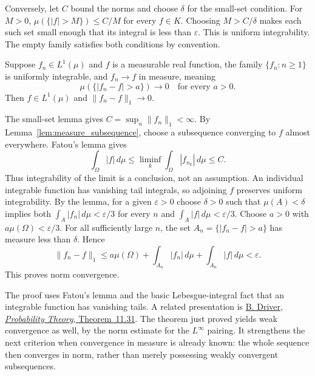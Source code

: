 Conversely, let $C$ bound the norms and choose $\delta$ for the
small-set condition. For $M>0$,
$\mu(\{|f|>M\})\leqslant C/M$ for every $f\in K$.
Choosing $M>C/\delta$ makes each such set small enough that its
integral is less than $\varepsilon$. This is uniform integrability.
The empty family satisfies both conditions by convention.
\Done

\begin{theorem}
\label{thm:vitali_finite}
Suppose $f_n\in L^1(\mu)$ and $f$ is a measurable real function, the family $\{f_n:n\geqslant1\}$ is
uniformly integrable, and $f_n\to f$ in measure, meaning
\[
\mu(\{|f_n-f|>a\})\longrightarrow0\quad\text{for every }a>0.
\]
Then $f\in L^1(\mu)$ and $\|f_n-f\|_1\to0$.
\end{theorem}
\Proof
The small-set lemma gives $C=\sup_n\|f_n\|_1<\infty$.
By Lemma~\ref{lem:measure_subsequence}, choose a subsequence converging
to $f$ almost everywhere. Fatou's lemma gives
\[
\int_\Omega|f|\,d\mu\leqslant
\liminf_k\int_\Omega|f_{n_k}|\,d\mu\leqslant C.
\]
Thus integrability of the limit is a conclusion, not an assumption.
An individual integrable function has vanishing tail integrals, so
adjoining $f$ preserves uniform integrability. By the lemma, for a
given $\varepsilon>0$ choose $\delta>0$ such that
$\mu(A)<\delta$ implies both
$\int_A|f_n|\,d\mu<\varepsilon/3$ for every $n$ and
$\int_A|f|\,d\mu<\varepsilon/3$.
Choose $a>0$ with $a\mu(\Omega)<\varepsilon/3$.
For all sufficiently large $n$, the set
$A_n=\{|f_n-f|>a\}$ has measure less than $\delta$. Hence
\[
\|f_n-f\|_1
\leqslant a\mu(\Omega)+\int_{A_n}|f_n|\,d\mu
                   +\int_{A_n}|f|\,d\mu
<\varepsilon.
\]
This proves norm convergence.
\Done

The proof uses Fatou's lemma and the basic Lebesgue-integral fact that
an integrable function has vanishing tails. A related presentation is
\href{https://mathweb.ucsd.edu/~bdriver/280_06-07/Lecture_Notes/N23_2p.pdf}
{B. Driver, \emph{Probability Theory}, Theorem~11.31}.
The theorem just proved yields weak convergence as well, by the norm
estimate for the $L^\infty$ pairing. It strengthens the next criterion
when convergence in measure is already known: the whole sequence then
converges in norm, rather than merely possessing weakly convergent
subsequences.

